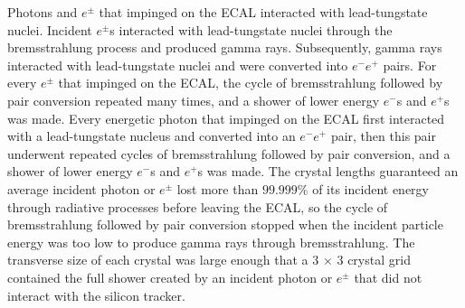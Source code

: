 Photons and $e^{\pm}$ that impinged on the ECAL interacted with lead-tungstate nuclei.  Incident $e^{\pm}$s interacted 
with lead-tungstate nuclei through the bremsstrahlung process and produced gamma rays.  Subsequently, gamma rays 
interacted with lead-tungstate nuclei and were converted into $e^{-}e^{+}$ pairs.  For every $e^{\pm}$ 
that impinged on the ECAL, the cycle of bremsstrahlung followed by pair conversion repeated many times, 
and a shower of lower energy $e^{-}$s and $e^{+}$s was made.  Every energetic photon that impinged on the 
ECAL first interacted with a lead-tungstate nucleus and converted into an $e^{-}e^{+}$ pair, then this pair underwent 
repeated cycles of bremsstrahlung followed by pair conversion, and a shower of lower energy $e^{-}$s and $e^{+}$s was made.  The crystal lengths 
guaranteed an average incident photon or $e^{\pm}$ lost more than $99.999$\% of its incident energy through 
radiative processes before leaving the ECAL, so the cycle of bremsstrahlung followed by pair conversion 
stopped when the incident particle energy was too low to produce gamma rays through bremsstrahlung.  The 
transverse size of each crystal was large enough that a 3 $\times$ 3 crystal grid contained the full shower 
created by an incident photon or $e^{\pm}$ that did not interact with the silicon tracker.

